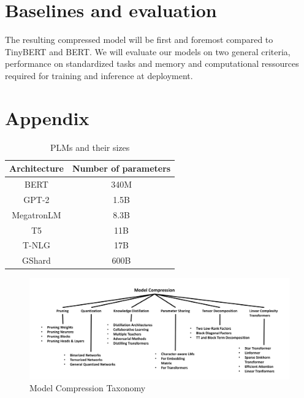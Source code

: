 \documentclass{article}
\begin{document}
\section{Baselines and evaluation} The resulting compressed model will be first
and foremost compared to TinyBERT and BERT. We will evaluate our models on two
general criteria, performance on standardized tasks and memory and computational
ressources required for training and inference at deployment.




\clearpage



\clearpage
\appendix
\section{Appendix}

\begin{table}[htbp]
\centering
  \begin{tabular}{cc}
    \toprule
    Architecture & Number of parameters\\
    \midrule
    BERT & 340M\\
    GPT-2 & 1.5B\\
    MegatronLM & 8.3B\\
    T5 & 11B\\
    T-NLG & 17B\\
    GShard & 600B\\
    \bottomrule
  \end{tabular}
  \caption{PLMs and their sizes\cite{gupta2020compression}}\label{plmsize}
\end{table}

\begin{figure}[h]
  \centering
  \includegraphics[width=\textwidth]{illustrations/modelcompressiontaxonomy}
  \caption{Model Compression Taxonomy\cite{gupta2020compression}}\label{fig:modelcompression}
\end{figure}

\end{document}
